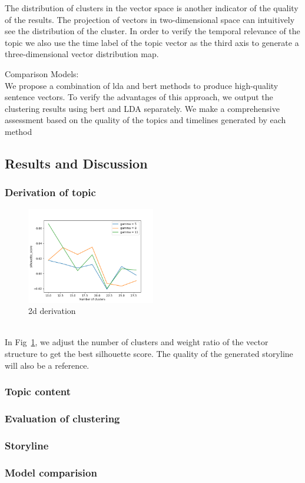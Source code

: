 The distribution of clusters in the vector space is another indicator of the quality of the results. The projection of vectors in two-dimensional space can intuitively see the distribution of the cluster. In order to verify the temporal relevance of the topic we also use the time label of the topic vector as the third axis to generate a three-dimensional vector distribution map.


Comparison Models: \\
We propose a combination of lda and bert methods to produce high-quality sentence vectors. To verify the advantages of this approach, we output the clustering results using bert and LDA separately. We make a comprehensive assessment based on the quality of the topics and timelines generated by each method
\subsection{Results and Discussion}
\subsubsection{Derivation of topic}
\begin{figure}[h]
\centering
\includegraphics[width=0.5\textwidth]{imgs/2d_derivation.png}
\caption{2d derivation}
\label{fig:2d_derivation}
\end{figure}


\\In Fig~\ref{fig:2d_derivation}, we adjust the number of clusters and weight ratio of the vector structure to get the best silhouette score. The quality of the generated storyline will also be a reference. 
\subsubsection{Topic content}
\subsubsection{Evaluation of clustering}
\subsubsection{Storyline}
\subsubsection{Model comparision}

